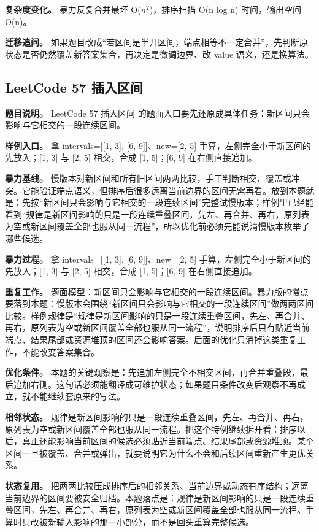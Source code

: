 \textbf{复杂度变化。} 暴力反复合并最坏 O(\ensuremath{n^{2}})，排序扫描 O(n log n) 时间，输出空间 O(n)。

\textbf{迁移追问。} 如果题目改成“若区间是半开区间，端点相等不一定合并”，先判断原状态是否仍然覆盖新答案集合，再决定是微调边界、改 value 语义，还是换算法。

\subsection{LeetCode 57 插入区间}

\textbf{题目说明。} LeetCode 57 插入区间 的题面入口要先还原成具体任务：新区间只会影响与它相交的一段连续区间。

\textbf{样例入口。} 拿 intervals=[[1, 3], [6, 9]]、new=[2, 5] 手算，左侧完全小于新区间的先放入；[1, 3] 与 [2, 5] 相交，合成 [1, 5]；[6, 9] 在右侧直接追加。

\textbf{暴力基线。} 慢版本对新区间和所有旧区间两两比较，手工判断相交、覆盖或冲突。它能验证端点语义，但排序后很多远离当前边界的区间无需再看。放到本题就是：先按“新区间只会影响与它相交的一段连续区间”完整试慢版本；样例里已经能看到“规律是新区间影响的只是一段连续重叠区间，先左、再合并、再右，原列表为空或新区间覆盖全部也服从同一流程”，所以优化前必须先能说清慢版本枚举了哪些候选。

\textbf{暴力过程。} 拿 intervals=[[1, 3], [6, 9]]、new=[2, 5] 手算，左侧完全小于新区间的先放入；[1, 3] 与 [2, 5] 相交，合成 [1, 5]；[6, 9] 在右侧直接追加。

\textbf{重复工作。} 题面模型：新区间只会影响与它相交的一段连续区间。暴力版的慢点要落到本题：慢版本会围绕“新区间只会影响与它相交的一段连续区间”做两两区间比较。样例规律是“规律是新区间影响的只是一段连续重叠区间，先左、再合并、再右，原列表为空或新区间覆盖全部也服从同一流程”，说明排序后只有贴近当前端点、结果尾部或资源堆顶的区间还会影响答案。后面的优化只消掉这类重复工作，不能改变答案集合。

\textbf{优化条件。} 本题的关键观察是：先追加左侧完全不相交区间，再合并重叠段，最后追加右侧。这句话必须能翻译成可维护状态；如果题目条件改变后观察不再成立，就不能继续套原来的写法。

\textbf{相邻状态。} 规律是新区间影响的只是一段连续重叠区间，先左、再合并、再右，原列表为空或新区间覆盖全部也服从同一流程。把这个特例继续拆开看：排序以后，真正还能影响当前区间的候选必须贴近当前端点、结果尾部或资源堆顶。某个区间一旦被覆盖、合并或弹出，就要说明它为什么不会和后续区间重新产生更优关系。

\textbf{状态复用。} 把两两比较压成排序后的相邻关系、当前边界或动态有序结构；远离当前边界的区间要被安全归档。本题落点是：规律是新区间影响的只是一段连续重叠区间，先左、再合并、再右，原列表为空或新区间覆盖全部也服从同一流程。手算时只改被新输入影响的那一小部分，而不是回头重算完整候选。

